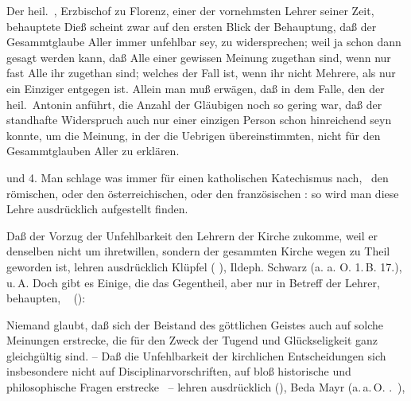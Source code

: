 \begin{aufza}
\begin{RWanm} Der heil.\ , Erzbischof zu Florenz, einer der vornehmsten Lehrer seiner Zeit, behauptete  Dieß scheint zwar auf den ersten Blick der Behauptung, daß der Gesammtglaube Aller immer unfehlbar sey, zu widersprechen; weil ja schon dann gesagt werden kann, daß Alle einer gewissen Meinung zugethan sind, wenn nur fast Alle ihr zugethan sind; welches der Fall ist, wenn ihr nicht Mehrere, als nur ein Einziger entgegen ist. Allein man muß erwägen, daß in dem Falle, den der heil.\ Antonin anführt, die Anzahl der Gläubigen noch so gering war, daß der standhafte Widerspruch auch nur einer einzigen Person schon hinreichend seyn konnte, um die Meinung, in der die Uebrigen übereinstimmten, nicht für den Gesammtglauben Aller zu erklären.
\end{RWanm}
\item und 4. Man schlage was immer für einen katholischen Katechismus nach, \zB\ den römischen, oder den österreichischen, oder den französischen \uA: so wird man diese Lehre ausdrücklich aufgestellt finden.
\item Daß der Vorzug der Unfehlbarkeit den Lehrern der Kirche  zukomme, weil er denselben nicht um ihretwillen, sondern der gesammten Kirche wegen zu Theil geworden ist, lehren ausdrücklich Klüpfel ( ), Ildeph. Schwarz (a. a. O. 1.\,B.\,\,17.), u.\,A. Doch gibt es Einige, die das Gegentheil, aber nur in Betreff der Lehrer, behaupten, \zB\  (): 
\item Niemand glaubt, daß sich der Beistand des göttlichen Geistes auch auf solche Meinungen erstrecke, die für den Zweck der Tugend und Glückseligkeit ganz gleichgültig sind. -- Daß die Unfehlbarkeit der kirchlichen Entscheidungen sich insbesondere nicht auf Disciplinarvorschriften, auf bloß historische und philosophische Fragen erstrecke \usw\ -- lehren ausdrücklich  (), Beda Mayr (a.\,a.\,O. .\ ), \umA

\end{aufza}
